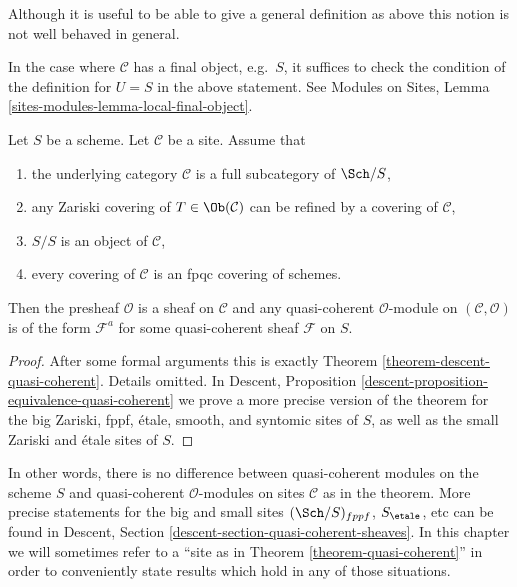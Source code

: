 \noindent
Although it is useful to be able to give a general definition as above
this notion is not well behaved in general.

\begin{remark}
\label{remark-final-object}
In the case where $\mathcal{C}$ has a final object, e.g.\ $S$, it
suffices to check the condition of the definition for
$U = S$ in the above statement. See
Modules on Sites, Lemma \ref{sites-modules-lemma-local-final-object}.
\end{remark}

\begin{theorem}
\label{theorem-quasi-coherent}
Let $S$ be a scheme.
Let $\mathcal{C}$ be a site. Assume that
\begin{enumerate}
\item the underlying category $\mathcal{C}$ is a
full subcategory of $\Sch/S$,
\item any Zariski covering of $T \in \Ob(\mathcal{C})$
can be refined by a covering of $\mathcal{C}$,
\item $S/S$ is an object of $\mathcal{C}$,
\item every covering of $\mathcal{C}$ is an fpqc covering of schemes.
\end{enumerate}
Then the presheaf $\mathcal{O}$ is a sheaf on $\mathcal{C}$ and
any quasi-coherent $\mathcal{O}$-module on $(\mathcal{C}, \mathcal{O})$
is of the form $\mathcal{F}^a$ for some quasi-coherent sheaf
$\mathcal{F}$ on $S$.
\end{theorem}

\begin{proof}
After some formal arguments this is exactly Theorem
\ref{theorem-descent-quasi-coherent}. Details omitted. In
Descent, Proposition \ref{descent-proposition-equivalence-quasi-coherent}
we prove a more precise version of the theorem for the
big Zariski, fppf, \'etale, smooth, and syntomic sites of $S$,
as well as the small Zariski and \'etale sites of $S$.
\end{proof}

\noindent
In other words, there is no difference between quasi-coherent
modules on the scheme $S$ and quasi-coherent $\mathcal{O}$-modules
on sites $\mathcal{C}$ as in the theorem. More precise statements
for the big and small sites $(\Sch/S)_{fppf}$, $S_\etale$, etc
can be found in
Descent, Section \ref{descent-section-quasi-coherent-sheaves}.
In this chapter we will sometimes refer to a
``site as in Theorem \ref{theorem-quasi-coherent}''
in order to conveniently state results which hold in any of those
situations.






